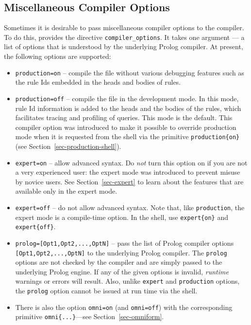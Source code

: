 \documentclass[11pt]{article}
\newcommand{\ERGO}{\mbox{\smaller{\ensuremath{\cal{E}}\smaller{{\sc{RGO}}}}}\xspace}
\newcommand{\FLSYSTEM}{\ERGO}
\begin{document}
\subsection{Miscellaneous Compiler Options}\label{misc-options}

Sometimes it is desirable to pass miscellaneous 
compiler options to the \FLSYSTEM
compiler. To do this, \FLSYSTEM provides the directive
{\tt compiler\_options}. It takes one argument --- a list of
options that is understood by the underlying Prolog compiler. At present,
the following options are supported:
\begin{itemize}
\item  \texttt{production=on} -- compile the file without various
  debugging features such as the rule Ids embedded in the heads and bodies
  of rules.
\item \texttt{production=off} -- compile the file in the development
  mode. In this mode, rule Id information is added to the heads and the
  bodies of the rules, which facilitates tracing and profiling of \FLSYSTEM
  queries. This mode is the default. This compiler option was introduced to
  make it possible to override production mode when it is
  requested from the \FLSYSTEM shell via the primitive
  \texttt{production\{on\}} (see Section~\ref{sec-production-shell}).
\item \texttt{expert=on} -- allow advanced syntax. 
  Do \emph{not} turn this option on if you are not a very
  experienced \FLSYSTEM user:
  the expert mode was introduced to prevent misuse by novice users.
  See Section~\ref{sec-expert} to learn about the features that are
  available only in the expert mode.
\item \texttt{expert=off} -- do not allow advanced syntax. Note that,
  like \texttt{production}, the expert mode is a compile-time option.
  In the \FLSYSTEM shell, use \texttt{expert\{on\}} and
  \texttt{expert\{off\}}.
\item \texttt{prolog=[Opt1,Opt2,...,OptN]} -- pass the list of Prolog
  compiler options \texttt{[Opt1,Opt2,...,OptN]} to the underlying Prolog
  compiler.  The \texttt{prolog} options are not checked by the \FLSYSTEM
  compiler and are simply passed to the underlying Prolog engine. If any of
  the given options is invalid, \emph{runtime} warnings or errors will result.
  Also, unlike \texttt{expert} and \texttt{production} options, the
  \texttt{prolog} option cannot be issued at run time via the \FLSYSTEM
  shell.
  \item There is also the option \texttt{omni=on} (and
    \texttt{omni=off}) with the corresponding primitive
    \texttt{omni\{...\}}---see Section~\ref{sec-omniform}.
\end{itemize}
\end{document}
